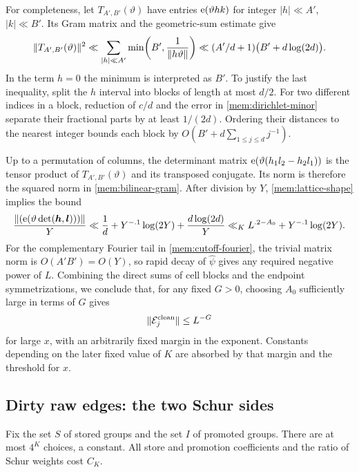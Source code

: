 For completeness, let $T_{A',B'}(\vartheta)$ have entries
$\mathrm{e}(\vartheta hk)$ for integer $|h|\ll A'$, $|k|\ll B'$.
Its Gram matrix and the geometric-sum estimate give
\begin{equation}\label{mem:bilinear-gram}
 \lVert T_{A',B'}(\vartheta)\rVert^2
 \ll\sum_{|h|\ll A'}\min\!\left(B',\frac1{\|h\vartheta\|}\right)
 \ll (A'/d+1)\bigl(B'+d\log(2d)\bigr).
\end{equation}
In the term $h=0$ the minimum is interpreted as $B'$. To justify the
last inequality, split the $h$ interval into blocks of length at most
$d/2$. For two different indices in a block, reduction of $c/d$ and
the error in \eqref{mem:dirichlet-minor} separate their fractional
parts by at least $1/(2d)$. Ordering their distances to the nearest
integer bounds each block by
$O(B'+d\sum_{1\le j\le d}j^{-1})$.

Up to a permutation of columns, the determinant matrix
$\mathrm{e}(\vartheta(h_1l_2-h_2l_1))$ is the tensor product of
$T_{A',B'}(\vartheta)$ and its transposed conjugate. Its norm is
therefore the squared norm in \eqref{mem:bilinear-gram}. After division
by $Y$, \eqref{mem:lattice-shape} implies the bound
\begin{equation}\label{mem:minor-decay}
 \frac{\lVert(\mathrm{e}(\vartheta\det(\boldsymbol h,\boldsymbol l)))\rVert}Y
 \ll \frac1d+Y^{-.1}\log(2Y)
          +\frac{d\log(2d)}Y
 \ll_K L^{.2-A_0}+Y^{-.1}\log(2Y).
\end{equation}
For the complementary Fourier tail in \eqref{mem:cutoff-fourier},
the trivial matrix norm is $O(A'B')=O(Y)$, so rapid decay of
$\widehat\psi$ gives any required negative power of $L$. Combining
the direct sums of cell blocks and the endpoint symmetrizations,
we conclude that, for any fixed $G>0$, choosing $A_0$ sufficiently
large in terms of $G$ gives
\begin{equation}\label{mem:clean-bound}
 \lVert\mathcal E_j^{\mathrm{clean}}\rVert\le L^{-G}
\end{equation}
for large $x$, with an arbitrarily fixed margin in the exponent.
Constants depending on the later fixed value of $K$ are absorbed by
that margin and the threshold for $x$.

\subsection{Dirty raw edges: the two Schur sides}

Fix the set $S$ of stored groups and the set $I$ of promoted groups.
There are at most $4^K$ choices, a constant. All store and promotion
coefficients and the ratio of Schur weights cost $C_K$.


